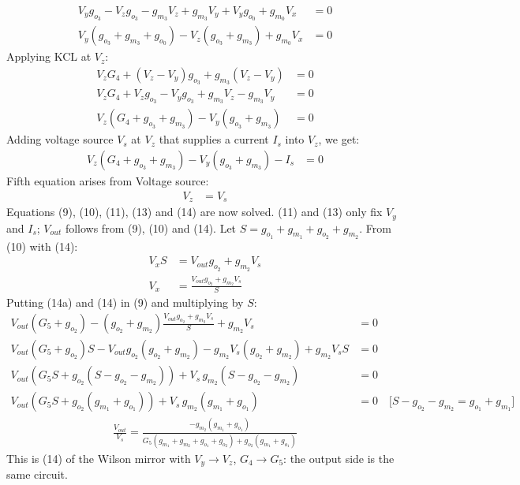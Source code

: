 \begin{enumerate}
\begin{align*}
      V_{y}g_{o_3} - V_{z}g_{o_3} - g_{m_3}V_{z} + g_{m_3}V_{y} + V_{y}g_{o_0} + g_{m_0}V_{x} &= 0 \\
      V_{y}(g_{o_3} + g_{m_3} + g_{o_0}) - V_{z}(g_{o_3} + g_{m_3}) + g_{m_0}V_{x} &= 0 \tag{11}
    \end{align*}
    Applying KCL at $V_{z}$:
    \begin{align*}
      V_{z}G_4 + (V_{z} - V_{y})g_{o_3} + g_{m_3}(V_{z} - V_{y}) &= 0 \\
      V_{z}G_4 + V_{z}g_{o_3} - V_{y}g_{o_3} + g_{m_3}V_{z} - g_{m_3}V_{y} &= 0 \\
      V_{z}(G_4 + g_{o_3} + g_{m_3}) - V_{y}(g_{o_3} + g_{m_3}) &= 0 \tag{12}
    \end{align*}
    Adding voltage source $V_s$ at $V_z$ that supplies
    a current $I_s$ into $V_z$, we get:
    \begin{align*}
      V_{z}(G_4 + g_{o_3} + g_{m_3}) - V_{y}(g_{o_3} + g_{m_3}) - I_s &= 0 \tag{13}
    \end{align*}
    Fifth equation arises from Voltage source:
    \begin{align*}
      V_{z} &= V_{s} \tag{14}
    \end{align*}
    Equations (9), (10), (11), (13) and (14) are now solved. (11) and
    (13) only fix \(V_y\) and \(I_s\); \(V_{out}\) follows from (9), (10)
    and (14). Let \(S = g_{o_1} + g_{m_1} + g_{o_2} + g_{m_2}\). From (10) with (14):
    \begin{align*}
      V_{x} S &= V_{out}g_{o_2} + g_{m_2}V_{s} \\
      V_{x} &= \frac{V_{out}g_{o_2} + g_{m_2}V_{s}}{S} \tag{14a}
    \end{align*}
    Putting (14a) and (14) in (9) and multiplying by \(S\):
    \begin{align*}
      V_{out}(G_5 + g_{o_2}) - (g_{o_2} + g_{m_2})\frac{V_{out}g_{o_2} + g_{m_2}V_{s}}{S} + g_{m_2}V_{s} &= 0 \\
      V_{out}(G_5 + g_{o_2})S - V_{out}g_{o_2}(g_{o_2} + g_{m_2}) - g_{m_2}V_{s}(g_{o_2} + g_{m_2}) + g_{m_2}V_{s}S &= 0 \\
      V_{out}\left(G_5 S + g_{o_2}(S - g_{o_2} - g_{m_2})\right) + V_{s}\,g_{m_2}(S - g_{o_2} - g_{m_2}) &= 0 \\
      V_{out}\left(G_5 S + g_{o_2}(g_{m_1} + g_{o_1})\right) + V_{s}\,g_{m_2}(g_{m_1} + g_{o_1}) &= 0 \quad \text{[} S - g_{o_2} - g_{m_2} = g_{o_1} + g_{m_1} \text{]}
    \end{align*}
    \begin{align*}
      \frac{V_{out}}{V_{s}} = \frac{-g_{m_2}(g_{m_1} + g_{o_1})}{G_5(g_{m_1} + g_{m_2} + g_{o_1} + g_{o_2}) + g_{o_2}(g_{m_1} + g_{o_1})} \tag{15}
    \end{align*}
    This is (14) of the Wilson mirror with \(V_y \to V_z\), \(G_4 \to G_5\):
    the output side is the same circuit.
\end{enumerate}

